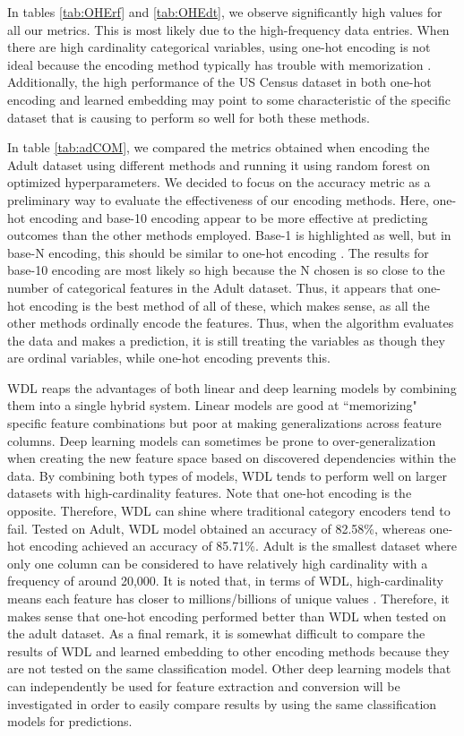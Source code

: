 \documentclass[12pt,letterpaper]{article}
\theoremstyle{plain}
\theoremstyle{definition}
\begin{document}
In tables \ref{tab:OHErf} and \ref{tab:OHEdt}, we observe significantly high values for all our metrics. This is most likely due to the high-frequency data entries. When there are high cardinality categorical variables, using one-hot encoding is not ideal because the encoding method typically has trouble with memorization \cite{encodingcateg}. Additionally, the high performance of the US Census dataset in both one-hot encoding and learned embedding may point to some characteristic of the specific dataset that is causing to perform so well for both these methods.

In table \ref{tab:adCOM}, we compared the metrics obtained when encoding the Adult dataset using different methods and running it using random forest on optimized hyperparameters. We decided to focus on the accuracy metric as a preliminary way to evaluate the effectiveness of our encoding methods. Here, one-hot encoding and base-10 encoding appear to be more effective at predicting outcomes than the other methods employed. Base-1 is highlighted as well, but in base-N encoding, this should be similar to one-hot encoding \cite{encodingcateg}. The results for base-10 encoding are most likely so high because the N chosen is so close to the number of categorical features in the Adult dataset. Thus, it appears that one-hot encoding is the best method of all of these, which makes sense, as all the other methods ordinally encode the features. Thus, when the algorithm evaluates the data and makes a prediction, it is still treating the variables as though they are ordinal variables, while one-hot encoding prevents this. 

WDL reaps the advantages of both linear and deep learning models by combining them into a single hybrid system. Linear models are good at ``memorizing" specific feature combinations but poor at making generalizations across feature columns. Deep learning models can sometimes be prone to over-generalization when creating the new feature space based on discovered dependencies within the data. By combining both types of models, WDL tends to perform well on larger datasets with high-cardinality features. Note that one-hot encoding is the opposite. Therefore, WDL can shine where traditional category encoders tend to fail. Tested on Adult, WDL model obtained an accuracy of 82.58\%, whereas one-hot encoding achieved an accuracy of 85.71\%. Adult is the smallest dataset where only one column can be considered to have relatively high cardinality with a frequency of around 20,000. It is noted that, in terms of WDL, high-cardinality means each feature has closer to millions/billions of unique values \cite{github}. Therefore, it makes sense that one-hot encoding performed better than WDL when tested on the adult dataset. As a final remark, it is somewhat difficult to compare the results of WDL and learned embedding to other encoding methods because they are not tested on the same classification model. Other deep learning models that can independently be used for feature extraction and conversion will be investigated in order to easily compare results by using the same classification models for predictions.
\end{document}
